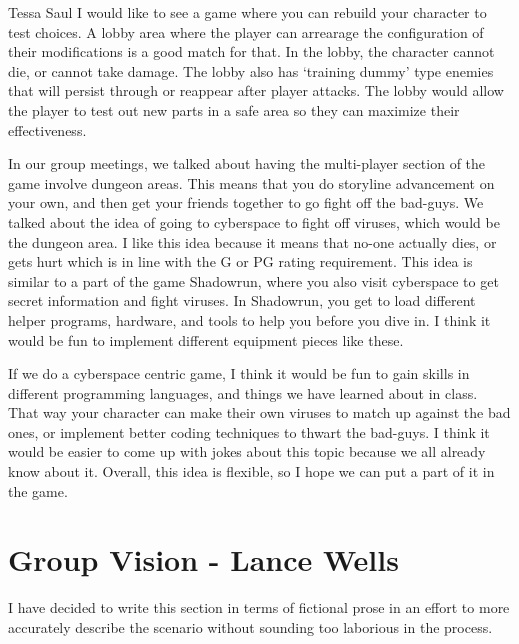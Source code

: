 \documentclass[12pt]{report}
\begin{document}
\begin{section}{Tessa Saul}
I would like to see a game where you can rebuild your character to test choices.
A lobby area where the player can arrearage the configuration of their 
modifications is a good match for that. In the lobby, the character cannot die,
or cannot take damage. The lobby also has `training dummy' type 
enemies that will persist through or reappear after player attacks. The lobby would allow
the player to test out new parts in a safe area so they can maximize their effectiveness.

In our group meetings, we talked about having the multi-player section of the game involve
dungeon areas. This means that you do storyline advancement on your own, and then get your
friends together to go fight off the bad-guys. We talked about the idea of going to cyberspace
to fight off viruses, which would be the dungeon area. I like this idea because it 
means that no-one actually dies, or gets hurt which is in line with the G or PG 
rating requirement. This idea is similar to a part of the game 
Shadowrun, where you also visit cyberspace to get secret information and fight viruses. In Shadowrun,
you get to load different helper programs, hardware, and tools to help you before you dive in. 
I think it would be fun to implement different equipment pieces like these. 

If we do a cyberspace centric game, I think it would be fun to gain skills in different programming languages,
and things we have learned about in class. That way your character can make their own viruses to 
match up against the bad ones, or implement better coding techniques to thwart the bad-guys. 
I think it would be easier to come up with jokes about this topic because we all already know about it. 
Overall, this idea is flexible, so I hope we can put a part of it in the game.
\end{section}

\chapter{Group Vision - Lance Wells}

I have decided to write this section in terms of fictional prose in an 
effort to more accurately describe the scenario without sounding too
laborious in the process.
\end{document}
